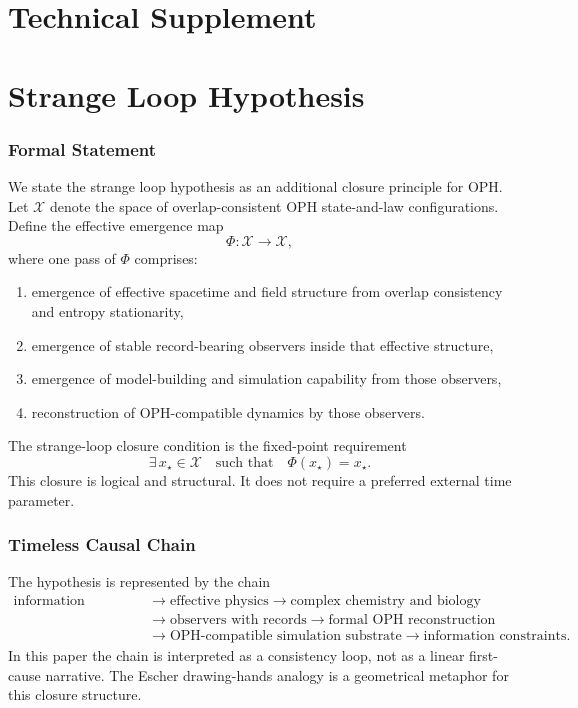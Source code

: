 \documentclass[11pt]{article}
\begin{document}
\clearpage
\part{Technical Supplement}


\clearpage
\part{Strange Loop Hypothesis}

\section{Formal Statement}
We state the strange loop hypothesis as an additional closure principle for OPH.
Let $\mathcal{X}$ denote the space of overlap-consistent OPH state-and-law configurations. Define the effective emergence map
\[
\Phi:\mathcal{X}\to\mathcal{X},
\]
where one pass of $\Phi$ comprises:
\begin{enumerate}
\item emergence of effective spacetime and field structure from overlap consistency and entropy stationarity,
\item emergence of stable record-bearing observers inside that effective structure,
\item emergence of model-building and simulation capability from those observers,
\item reconstruction of OPH-compatible dynamics by those observers.
\end{enumerate}
The strange-loop closure condition is the fixed-point requirement
\[
\exists\,x_\star\in\mathcal{X} \quad \text{such that} \quad \Phi(x_\star)=x_\star.
\]
This closure is logical and structural. It does not require a preferred external time parameter.

\section{Timeless Causal Chain}
The hypothesis is represented by the chain
\[
\begin{aligned}
\text{information constraints}
&\to \text{effective physics}
\to \text{complex chemistry and biology}\\
&\to \text{observers with records}
\to \text{formal OPH reconstruction}\\
&\to \text{OPH-compatible simulation substrate}
\to \text{information constraints}.
\end{aligned}
\]
In this paper the chain is interpreted as a consistency loop, not as a linear first-cause narrative. The Escher drawing-hands analogy is a geometrical metaphor for this closure structure.
\end{document}
